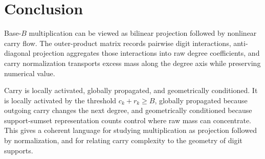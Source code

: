 \section{Conclusion}

Base-\(B\) multiplication can be viewed as bilinear projection followed by
nonlinear carry flow. The outer-product matrix records pairwise digit
interactions, anti-diagonal projection aggregates those interactions into raw
degree coefficients, and carry normalization transports excess mass along the
degree axis while preserving numerical value.

Carry is locally activated, globally propagated, and geometrically
conditioned. It is locally activated by the threshold \(c_k+r_k\ge B\), globally
propagated because outgoing carry changes the next degree, and geometrically
conditioned because support-sumset representation counts control where raw mass
can concentrate. This gives a coherent language for studying multiplication as
projection followed by normalization, and for relating carry complexity to the
geometry of digit supports.
